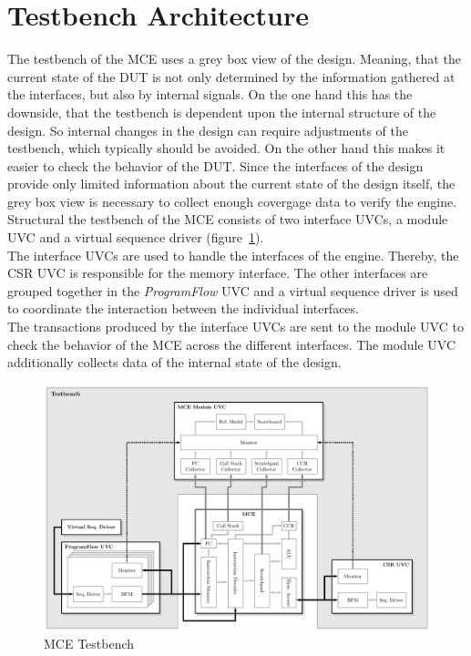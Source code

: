 \section{Testbench Architecture}

The testbench of the MCE uses a grey box view of the design.
Meaning, that the current state of the DUT is not only determined by the information gathered at the interfaces, but also by internal signals.
On the one hand this has the downside, that the testbench is dependent upon the internal structure of the design.
So internal changes in the design can require adjustments of the testbench, which typically should be avoided.
On the other hand this makes it easier to check the behavior of the DUT.
Since the interfaces of the design provide only limited information about the current state of the design itself, the grey box view is necessary to collect enough covergage data to verify the engine.\\ 
Structural the testbench of the MCE consists of two interface UVCs, a module UVC and a virtual sequence driver (figure~\ref{fig:mce_tb}).\\
The interface UVCs are used to handle the interfaces of the engine.
Thereby, the CSR UVC is responsible for the memory interface.
The other interfaces are grouped together in the \emph{ProgramFlow} UVC and a virtual sequence driver is used to coordinate the interaction between the individual interfaces.\\
The transactions produced by the interface UVCs are sent to the module UVC to check the behavior of the MCE across the different interfaces.
The module UVC additionally collects data of the internal state of the design.



\begin{figure}[htb]
 \centering
 \includegraphics[width=1.0\textwidth,angle=0]{images/mce_tb}
 \caption{MCE Testbench}
\label{fig:mce_tb}
\end{figure}

